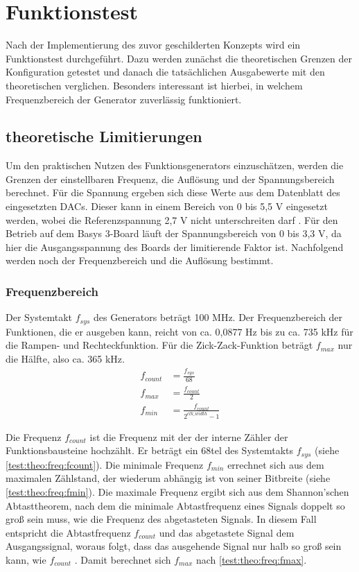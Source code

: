 \chapter{Funktionstest}
Nach der Implementierung des zuvor geschilderten Konzepts wird ein Funktionstest durchgeführt.
Dazu werden zunächst die theoretischen Grenzen der Konfiguration getestet und danach die tatsächlichen Ausgabewerte mit den theoretischen verglichen.
Besonders interessant ist hierbei, in welchem Frequenzbereich der Generator zuverlässig funktioniert.

\section{theoretische Limitierungen}
Um den praktischen Nutzen des Funktionsgenerators einzuschätzen, werden die Grenzen der einstellbaren Frequenz, die Auflösung und der Spannungsbereich berechnet.
Für die Spannung ergeben sich diese Werte aus dem Datenblatt des eingesetzten DACs.
Dieser kann in einem Bereich von 0 bis 5,5 V eingesetzt werden, wobei die Referenzspannung 2,7 V nicht unterschreiten darf \cite{PmodDA2}.
Für den Betrieb auf dem Basys 3-Board läuft der Spannungsbereich von 0 bis 3,3 V, da hier die Ausgangsspannung des Boards der limitierende Faktor ist.
Nachfolgend werden noch der Frequenzbereich und die Auflösung bestimmt.

\subsection{Frequenzbereich}
Der Systemtakt $f_{sys}$ des Generators beträgt 100 MHz.
Der Frequenzbereich der Funktionen, die er ausgeben kann, reicht von ca. 0,0877 Hz bis zu ca. 735 kHz für die Rampen- und Rechteckfunktion.
Für die Zick-Zack-Funktion beträgt $f_{max}$ nur die Hälfte, also ca. 365 kHz.\\

\begin{align}
  f_{count} &= \frac{f_{sys}}{68} \label{test:theo:freq:fcount}\\  
  f_{max} &= \frac{f_{count}}{2}  \label{test:theo:freq:fmax}\\ 
  f_{min} &= \frac{f_{count}}{2^{clk\_width} - 1} \label{test:theo:freq:fmin}
\end{align}

Die Frequenz $f_{count}$ ist die Frequenz mit der der interne Zähler der Funktionsbausteine hochzählt.
Er beträgt ein 68tel des Systemtakts $f_{sys}$ (siehe \cref{test:theo:freq:fcount}).
Die minimale Frequenz $f_{min}$ errechnet sich aus dem maximalen Zählstand, der wiederum abhängig ist von seiner Bitbreite  (siehe \cref{test:theo:freq:fmin}).
Die maximale Frequenz ergibt sich aus dem Shannon'schen Abtasttheorem, nach dem die minimale Abtastfrequenz eines Signals doppelt so groß sein muss, wie die Frequenz des abgetasteten Signals.
In diesem Fall entspricht die Abtastfrequenz $f_{count}$ und das abgetastete Signal dem Ausgangssignal, woraus folgt, dass das ausgehende Signal nur halb so groß sein kann, wie $f_{count}$ \cite{nyquist1928}. Damit berechnet sich $f_{max}$ nach \cref{test:theo:freq:fmax}.


